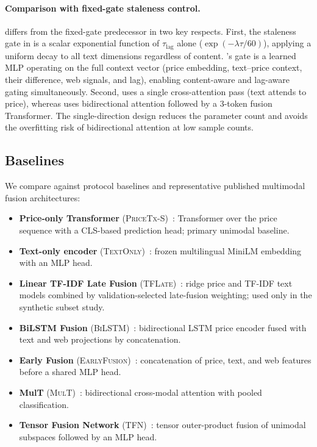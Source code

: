 \paragraph{Comparison with fixed-gate staleness control.}
\CGCMA{} differs from the fixed-gate predecessor \SACMA{} in two key respects.
First, the staleness gate in \SACMA{} is a scalar exponential function of $\tau_{\mathrm{lag}}$ alone ($\exp(-\lambda \tau / 60)$), applying a uniform decay to all text dimensions regardless of content.
\CGCMA{}'s gate is a learned MLP operating on the full context vector (price embedding, text--price context, their difference, web signals, and lag), enabling content-aware and lag-aware gating simultaneously.
Second, \CGCMA{} uses a single cross-attention pass (text attends to price), whereas \SACMA{} uses bidirectional attention followed by a 3-token fusion Transformer.
The single-direction design reduces the parameter count and avoids the overfitting risk of bidirectional attention at low sample counts.

\subsection{Baselines}
\label{sec:baselines}

We compare \CGCMA{} against protocol baselines and representative published multimodal fusion architectures:

\begin{itemize}
  \item \textbf{Price-only Transformer} (\textsc{PriceTx-S})~\cite{vaswani2017attention}: Transformer over the price sequence with a CLS-based prediction head; primary unimodal baseline.
  \item \textbf{Text-only encoder} (\textsc{TextOnly})~\cite{reimers2019sentencebert}: frozen multilingual MiniLM embedding with an MLP head.
  \item \textbf{Linear TF-IDF Late Fusion} (\textsc{TFLate})~\cite{hoerl1970ridge,salton1988term}: ridge price and TF-IDF text models combined by validation-selected late-fusion weighting; used only in the synthetic subset study.
  \item \textbf{BiLSTM Fusion} (\textsc{BiLSTM})~\cite{xu2018stocknet}: bidirectional LSTM price encoder fused with text and web projections by concatenation.
  \item \textbf{Early Fusion} (\textsc{EarlyFusion})~\cite{baltrusaitis2019multimodal}: concatenation of price, text, and web features before a shared MLP head.
  \item \textbf{MulT} (\textsc{MulT})~\cite{tsai2019multimodal}: bidirectional cross-modal attention with pooled classification.
  \item \textbf{Tensor Fusion Network} (\textsc{TFN})~\cite{zadeh2017tensor}: tensor outer-product fusion of unimodal subspaces followed by an MLP head.
\end{itemize}

